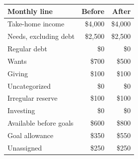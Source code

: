 \par\noindent\begin{tabularx}{\textwidth}{@{}Yrr@{}}
\toprule
Monthly line & Before & After\\\midrule
Take-home income & \$4,000 & \$4,000\\
Needs, excluding debt & \$2,500 & \$2,500\\
Regular debt & \$0 & \$0\\
Wants & \$700 & \$500\\
Giving & \$100 & \$100\\
Uncategorized & \$0 & \$0\\
Irregular reserve & \$100 & \$100\\
Investing & \$0 & \$0\\
Available before goals & \$600 & \$800\\
Goal allowance & \$350 & \$550\\
Unassigned & \$250 & \$250\\
\bottomrule
\end{tabularx}\par
